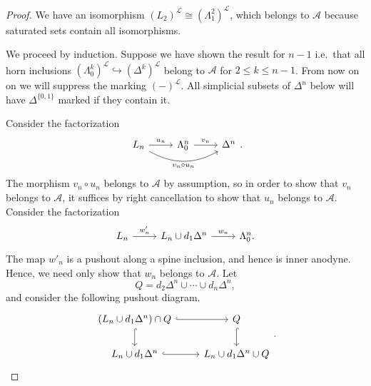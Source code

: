 \documentclass[main.tex]{subfiles}
\begin{document}
\begin{proof}
  We have an isomorphism $(L_{2})^{\mathcal{L}} \cong (\Lambda^{2}_{1})^{\mathcal{L}}$, which belongs to $\mathcal{A}$ because saturated sets contain all isomorphisms.

  We proceed by induction. Suppose we have shown the result for $n - 1$ i.e.\ that all horn inclusions $(\Lambda^{k}_{0})^{\mathcal{L}} \hookrightarrow (\Delta^{k})^{\mathcal{L}}$ belong to $\mathcal{A}$ for $2 \leq k \leq n-1$.  From now on on we will suppress the marking $(-)^{\mathcal{L}}$. All simplicial subsets of $\Delta^{n}$ below will have $\Delta^{\{0, 1\}}$ marked if they contain it.

  Consider the factorization
  \begin{equation*}
    \begin{tikzcd}
      L_{n}
      \arrow[r, "u_{n}"]
      \arrow[rr, bend right, swap, "v_{n} \circ u_{n}"]
      & \Lambda^{n}_{0}
      \arrow[r, "v_{n}"]
      & \Delta^{n}
    \end{tikzcd}.
  \end{equation*}
  The morphism $v_{n} \circ u_{n}$ belongs to $\mathcal{A}$ by assumption, so in order to show that $v_{n}$ belongs to $\mathcal{A}$, it suffices by right cancellation to show that $u_{n}$ belongs to $\mathcal{A}$. Consider the factorization
  \begin{equation*}
    \begin{tikzcd}
      L_{n}
      \arrow[r, "w'_{n}"]
      & L_{n} \cup d_{1} \Delta^{n}
      \arrow[r, "w_{n}"]
      & \Lambda^{n}_{0}.
    \end{tikzcd}
  \end{equation*}
  The map $w'_{n}$ is a pushout along a spine inclusion, and hence is inner anodyne. Hence, we need only show that $w_{n}$ belongs to $\mathcal{A}$. Let
  \begin{equation*}
    Q = d_{2} \Delta^{n} \cup \cdots \cup d_{n} \Delta^{n},
  \end{equation*}
  and consider the following pushout diagram.
  \begin{equation*}
    \begin{tikzcd}
      (L_{n} \cup d_{1}\Delta^{n}) \cap Q
      \arrow[r, hook]
      \arrow[d, hook]
      & Q
      \arrow[d, hook]
      \\
      L_{n} \cup d_{1} \Delta^{n}
      \arrow[r, hook]
      & L_{n} \cup d_{1}\Delta^{n} \cup Q
    \end{tikzcd}.
  \end{equation*}

\end{proof}
\end{document}
